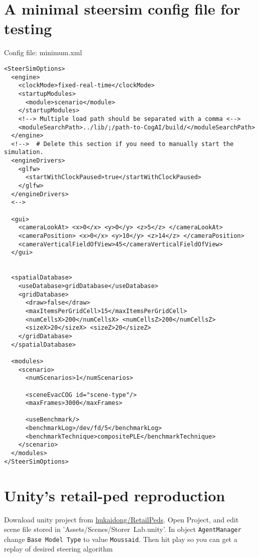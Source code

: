 \section{A minimal steersim config file for testing}
\label{sec:steersim-config}
Config file:  minimum.xml
\begin{verbatim}
<SteerSimOptions>
  <engine>
    <clockMode>fixed-real-time</clockMode>
    <startupModules>
      <module>scenario</module>
    </startupModules>
    <!--> Multiple load path should be separated with a comma <-->
    <moduleSearchPath>../lib/;/path-to-CogAI/build/</moduleSearchPath>
  </engine>
  <!-->  # Delete this section if you need to manually start the simulation.
  <engineDrivers>
    <glfw>
      <startWithClockPaused>true</startWithClockPaused>
    </glfw>
  </engineDrivers>
  <-->

  <gui>
    <cameraLookAt> <x>0</x> <y>0</y> <z>5</z> </cameraLookAt>
    <cameraPosition> <x>0</x> <y>10</y> <z>14</z> </cameraPosition>
    <cameraVerticalFieldOfView>45</cameraVerticalFieldOfView>
  </gui>


  <spatialDatabase>
    <useDatabase>gridDatabase</useDatabase>
    <gridDatabase>
      <draw>false</draw>
      <maxItemsPerGridCell>15</maxItemsPerGridCell>
      <numCellsX>200</numCellsX> <numCellsZ>200</numCellsZ>
      <sizeX>20</sizeX> <sizeZ>20</sizeZ>
    </gridDatabase>
  </spatialDatabase>

  <modules>
    <scenario>
      <numScenarios>1</numScenarios>

      <sceneEvacCOG id="scene-type"/>
      <maxFrames>3000</maxFrames>

      <useBenchmark/>
      <benchmarkLog>/dev/fd/5</benchmarkLog>
      <benchmarkTechnique>compositePLE</benchmarkTechnique>
    </scenario>
  </modules>
</SteerSimOptions>
\end{verbatim}


\section{Unity's retail-ped reproduction} %

Download unity project from \href{ 
https://github.com/hukaidong/RetailPeds/tree/a46f14017152f101e3e420522edc3b41b4406dbc 
}{hukaidong/RetailPeds}. Open Project, and edit scene file stored in 
'Assets/Scenes/Storer~Lab.unity'. In object \texttt{AgentManager} 
change \texttt{Base Model Type} to value 
\texttt{Moussaid}. Then hit play so you can get a replay of desired 
steering algorithm \cite{moussaid2011how}

